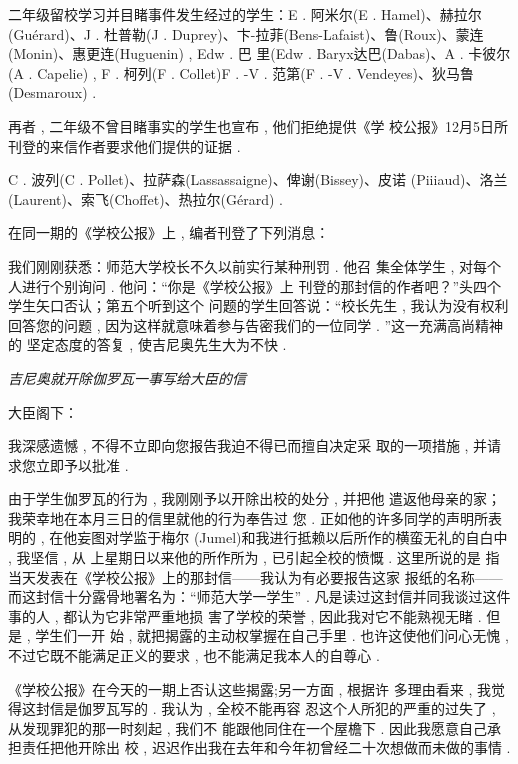 二年级留校学习并目睹事件发生经过的学生：E . 阿米尔(E .  Hamel)、赫拉尔(Guérard)、J . 杜普勒(J .  Duprey)、卞-拉菲(Bens-Lafaist)、鲁(Roux)、蒙连(Monin)、惠更连(Huguenin) ,  Edw . 巴 里(Edw .  Baryx达巴(Dabas)、A . 卡彼尔(A . Capelie) ,  F . 柯列(F . Collet)F . -V . 范第(F . -V . Vendeyes)、狄马鲁(Desmaroux) . 

再者 , 二年级不曾目睹事实的学生也宣布 , 他们拒绝提供《学 校公报》12月5日所刊登的来信作者要求他们提供的证据 . 

C . 波列(C .  Pollet)、拉萨森(Lassassaigne)、俾谢(Bissey)、皮诺 (Piiiaud)、洛兰(Laurent)、索飞(Choffet)、热拉尔(Gérard)  . 

\par

在同一期的《学校公报》上 , 编者刊登了下列消息：

我们刚刚获悉：师范大学校长不久以前实行某种刑罚 . 他召 集全体学生 , 对每个人进行个别询问 . 他问：“你是《学校公报》上 刊登的那封信的作者吧？”头四个学生矢口否认；第五个听到这个 问题的学生回答说：“校长先生 , 我认为没有权利回答您的问题 , 因为这样就意味着参与告密我们的一位同学 . ”这一充满高尚精神的 坚定态度的答复 , 使吉尼奥先生大为不快 . 

\begin{center}
	\emph{吉尼奥就开除伽罗瓦一事写给大臣的信}
\end{center}

大臣阁下：

我深感遗憾 , 不得不立即向您报告我迫不得已而擅自决定采 取的一项措施 , 并请求您立即予以批准 . 

由于学生伽罗瓦的行为 , 我刚刚予以开除出校的处分 , 并把他 遣返他母亲的家；我荣幸地在本月三日的信里就他的行为奉告过 您 . 正如他的许多同学的声明所表明的 , 在他妄图对学监于梅尔 (Jumel)和我进行抵赖以后所作的横蛮无礼的自白中 , 我坚信 , 从 上星期日以来他的所作所为 , 已引起全校的愤慨 . 这里所说的是 指当天发表在《学校公报》上的那封信——我认为有必要报告这家 报纸的名称——而这封信十分露骨地署名为：“师范大学一学生” .  凡是读过这封信并同我谈过这件事的人 , 都认为它非常严重地损 害了学校的荣誉 , 因此我对它不能熟视无睹 . 但是 , 学生们一开 始 , 就把揭露的主动权掌握在自己手里 . 也许这使他们问心无愧 ,  不过它既不能满足正义的要求 , 也不能满足我本人的自尊心 . 

《学校公报》在今天的一期上否认这些揭露;另一方面 , 根据许 多理由看来 , 我觉得这封信是伽罗瓦写的 . 我认为 , 全校不能再容 忍这个人所犯的严重的过失了 , 从发现罪犯的那一时刻起 , 我们不 能跟他同住在一个屋檐下 . 因此我愿意自己承担责任把他开除出 校 , 迟迟作出我在去年和今年初曾经二十次想做而未做的事情 . 

